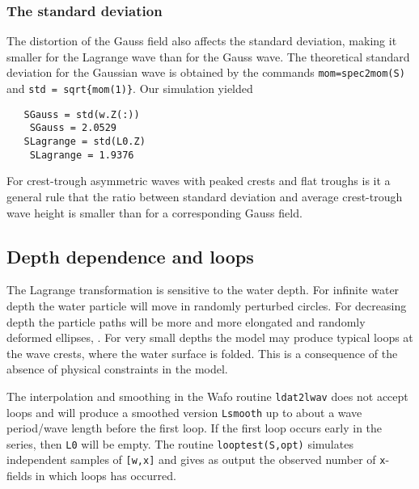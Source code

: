 \subsubsection*{The standard deviation}

The distortion of the Gauss field also affects the standard deviation, making it smaller for the Lagrange wave 
than for the Gauss wave. The theoretical standard deviation for the Gaussian wave is obtained by the 
commands {\tt mom=spec2mom(S)} and {\tt std = sqrt\{mom(1)\}}. Our simulation yielded
{\small\begin{verbatim}
   SGauss = std(w.Z(:))
	SGauss = 2.0529
   SLagrange = std(L0.Z)
	SLagrange = 1.9376
\end{verbatim}
}
\noindent
For crest-trough asymmetric waves with peaked crests and flat troughs is it a general rule that the ratio between 
standard deviation and average crest-trough wave height is smaller than for a corresponding Gauss field.
\subsection{Depth dependence and loops}\label{loops}

The Lagrange transformation is  sensitive to the water depth. For infinite water depth the water particle will move in randomly perturbed circles. For decreasing depth the particle paths will be more and more elongated and randomly deformed ellipses, \cite{Miche1944Mouvements}. For very small depths the model may produce typical loops at the wave crests, where the water surface is folded. This is a consequence of the absence of physical constraints in the model.

The interpolation and smoothing in the {\sc Wafo}
routine {\tt ldat2lwav} does not accept loops and will produce a smoothed version  {\tt  Lsmooth}
up to about a wave period/wave length before the first loop. If the first loop occurs early in the series, then {\tt L0} will be empty.
The routine {\tt looptest(S,opt)} simulates independent samples of {\tt [w,x]} and gives as output the observed number of {\tt x}-fields in which loops has occurred.

